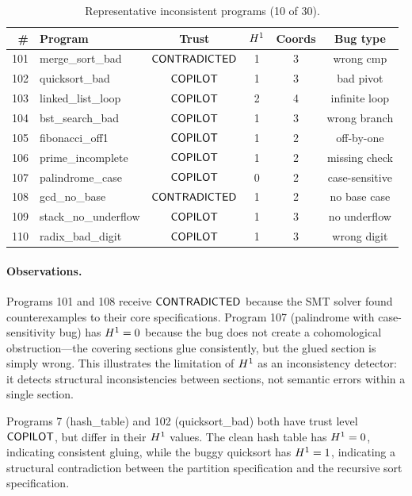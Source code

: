 \documentclass[11pt]{article}
\begin{document}
\begin{table}[H]
\centering
\caption{Representative inconsistent programs (10 of 30).}
\label{tab:benchmark-incon}
\small
\begin{tabular}{@{}rlcccc@{}}
\toprule
\textbf{\#} & \textbf{Program} & \textbf{Trust}
  & $H^{1}$ & \textbf{Coords} & \textbf{Bug type} \\
\midrule
101 & merge\_sort\_bad     & $\mathsf{CONTRADICTED}$  & 1 & 3 & wrong cmp \\
102 & quicksort\_bad       & $\mathsf{COPILOT}$ & 1 & 3 & bad pivot \\
103 & linked\_list\_loop   & $\mathsf{COPILOT}$ & 2 & 4 & infinite loop \\
104 & bst\_search\_bad     & $\mathsf{COPILOT}$ & 1 & 3 & wrong branch \\
105 & fibonacci\_off1      & $\mathsf{COPILOT}$ & 1 & 2 & off-by-one \\
106 & prime\_incomplete    & $\mathsf{COPILOT}$ & 1 & 2 & missing check \\
107 & palindrome\_case     & $\mathsf{COPILOT}$ & 0 & 2 & case-sensitive \\
108 & gcd\_no\_base        & $\mathsf{CONTRADICTED}$  & 1 & 2 & no base case \\
109 & stack\_no\_underflow & $\mathsf{COPILOT}$ & 1 & 3 & no underflow \\
110 & radix\_bad\_digit    & $\mathsf{COPILOT}$ & 1 & 3 & wrong digit \\
\bottomrule
\end{tabular}
\end{table}

\paragraph{Observations.}
Programs 101 and 108 receive $\mathsf{CONTRADICTED}$ because the SMT
solver found counterexamples to their core specifications.
Program 107 (palindrome with case-sensitivity bug) has
$H^{1} = 0$ because the bug does not create a
cohomological obstruction---the covering sections glue
consistently, but the glued section is simply wrong.
This illustrates the limitation of $H^{1}$ as an
inconsistency detector: it detects structural inconsistencies
between sections, not semantic errors within a single section.

Programs 7 (hash\_table) and 102 (quicksort\_bad) both have
trust level $\mathsf{COPILOT}$, but differ in their $H^{1}$
values.  The clean hash table has $H^{1} = 0$, indicating
consistent gluing, while the buggy quicksort has
$H^{1} = 1$, indicating a structural contradiction
between the partition specification and the recursive
sort specification.
\end{document}
